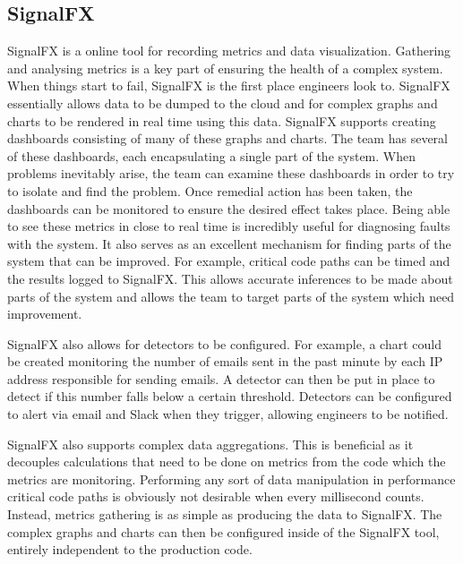 \subsection{SignalFX}
SignalFX \cite{sigfx} is a online tool for recording metrics and data visualization. Gathering and analysing metrics is a key part of ensuring the health of a complex system. When things start to fail, SignalFX is the first place engineers look to. SignalFX essentially allows data to be dumped to the cloud and for complex graphs and charts to be rendered in real time using this data. SignalFX supports creating dashboards consisting of many of these graphs and charts. The \team{} team has several of these dashboards, each encapsulating a single part of the system. When problems inevitably arise, the team can examine these dashboards in order to try to isolate and find the problem. Once remedial action has been taken, the dashboards can be monitored to ensure the desired effect takes place. Being able to see these metrics in close to real time is incredibly useful for diagnosing faults with the system. It also serves as an excellent mechanism for finding parts of the system that can be improved. For example, critical code paths can be timed and the results logged to SignalFX. This allows accurate inferences to be made about parts of the system and allows the team to target parts of the system which need improvement.

SignalFX also allows for detectors to be configured. For example, a chart could be created monitoring the number of emails sent in the past minute by each IP address responsible for sending emails. A detector can then be put in place to detect if this number falls below a certain threshold. Detectors can be configured to alert via email and Slack when they trigger, allowing engineers to be notified. 

SignalFX also supports complex data aggregations. This is beneficial as it decouples calculations that need to be done on metrics from the code which the metrics are monitoring. Performing any sort of data manipulation in performance critical code paths is obviously not desirable when every millisecond counts. Instead, metrics gathering is as simple as producing the data to SignalFX. The complex graphs and charts can then be configured inside of the SignalFX tool, entirely independent to the production code. 
